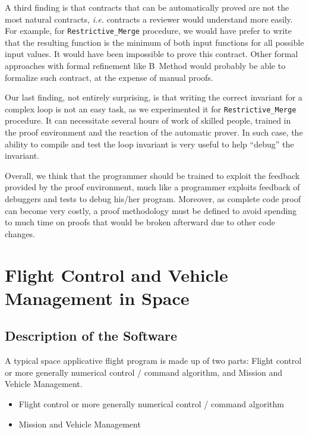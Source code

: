 \documentclass[10pt,a4paper,twocolumn]{article}
\newcommand{\ie}{\textit{i.e.}\xspace}
\newcommand{\SPARK}[1]{\lstinline[language=Ada,basicstyle={\footnotesize
      \sffamily},framesep=0pt]$#1$}
\begin{document}
A third finding is that contracts that can be automatically proved are
not the most natural contracts, \ie contracts a reviewer would
understand more easily. For example, for \SPARK{Restrictive_Merge}
procedure, we would have prefer to write that the resulting function
is the minimum of both input functions for all possible input
values. It would have been impossible to prove this contract. Other
formal approaches with formal refinement like B~Method would probably
be able to formalize such contract, at the expense of manual proofs.

Our last finding, not entirely surprising, is that writing the correct
invariant for a complex loop is not an easy task, as we experimented
it for \SPARK{Restrictive_Merge} procedure. It can necessitate several
hours of work of skilled people, trained in the proof environment and
the reaction of the automatic prover. In such case, the ability to
compile and test the loop invariant is very useful to help ``debug''
the invariant.

Overall, we think that the programmer should be trained to exploit the
feedback provided by the proof environment, much like a programmer
exploits feedback of debuggers and tests to debug his/her program.
Moreover, as complete code proof can become very costly, a proof
methodology must be defined to avoid spending to much time on proofs
that would be broken afterward due to other code changes.

\section{Flight Control and Vehicle Management in Space}



\subsection{Description of the Software}

A typical space applicative flight program is made up of two parts:
\ifdefined\abstractonly
Flight control or more generally numerical control / command algorithm, and Mission and Vehicle Management.

\else

\begin{itemize}
\item Flight control or more generally numerical control / command algorithm
\item Mission and Vehicle Management
\end{itemize}
\fi
\end{document}
